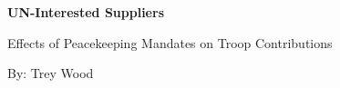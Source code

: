 \begin{titlepage}
	\begin{center}
		\vspace*{1cm}
		\huge %
		\textbf{UN-Interested Suppliers}
		
		\vspace{0.25cm}
		\LARGE
		Effects of Peacekeeping Mandates on Troop Contributions
		
	\vspace{1cm}

	\vspace{1cm}
	\Large

	\vspace{1cm}
	\Large
	By: Trey Wood

	\vspace{1cm}

\begin{comment}

	\begin{figure}[h]
	\begin{center}
	\texttt{[image: Screen Shot 2021-08-26 at 4.53.11 PM.png]}
	\end{center}
	\end{figure}

\end{comment}
	
	\vfill
	
	\end{center}
\end{titlepage}